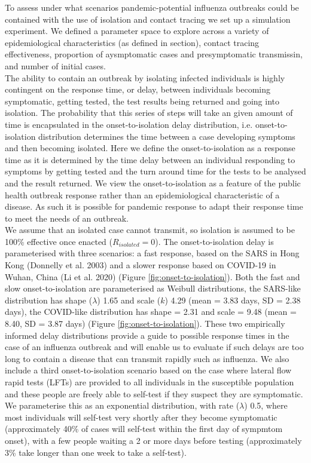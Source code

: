 \documentclass{article}
\begin{document}
To assess under what scenarios pandemic-potential influenza outbreaks could be contained with the use of isolation and contact tracing we set up a simulation experiment. We defined a parameter space to explore across a variety of epidemiological characteristics (as defined in  section), contact tracing effectiveness, proportion of aysmptomatic cases and presymptomatic transmissin, and number of initial cases. \\

The ability to contain an outbreak by isolating infected individuals is highly contingent on the response time, or delay, between individuals becoming symptomatic, getting tested, the test results being returned and going into isolation. The probability that this series of steps will take an given amount of time is encapsulated in the onset-to-isolation delay distribution, i.e. onset-to-isolation distribution determines the time between a case developing symptoms and then becoming isolated. Here we define the onset-to-isolation as a response time as it is determined by the time delay between an individual responding to symptoms by getting tested and the turn around time for the tests to be analysed and the result returned. We view the onset-to-isolation as a feature of the public health outbreak response rather than an epidemiological characteristic of a disease. As such it is possible for pandemic response to adapt their response time to meet the needs of an outbreak. \\

We assume that an isolated case cannot transmit, so isolation is assumed to be 100\% effective once enacted ($R_{isolated} = 0$). The onset-to-isolation delay is parameterised with three scenarios: a fast response, based on the SARS in Hong Kong (Donnelly et al. 2003) and a slower response based on COVID-19 in Wuhan, China (Li et al. 2020) (Figure \ref{fig:onset-to-isolation}). Both the fast and slow onset-to-isolation are parameterised as Weibull distributions, the SARS-like distribution has shape ($\lambda$) 1.65 and scale ($k$) 4.29 (mean = 3.83 days, SD = 2.38 days), the COVID-like distribution has shape = 2.31 and scale = 9.48 (mean = 8.40, SD = 3.87 days) (Figure \ref{fig:onset-to-isolation}). These two empirically informed delay distributions provide a guide to possible response times in the case of an influenza outbreak and will enable us to evaluate if such delays are too long to contain a disease that can transmit rapidly such as influenza. We also include a third onset-to-isolation scenario based on the case where lateral flow rapid tests (LFTs) are provided to all individuals in the susceptible population and these people are freely able to self-test if they suspect they are symptomatic. We parameterise this as an exponential distribution, with rate ($\lambda$) 0.5, where most individuals will self-test very shortly after they become symptomatic (approximately 40\% of cases will self-test within the first day of sympmtom onset), with a few people waiting a 2 or more days before testing (approximately 3\% take longer than one week to take a self-test). \\
\end{document}
